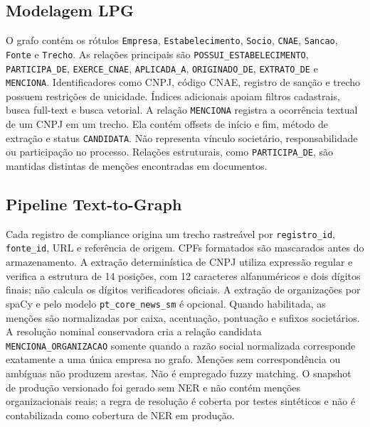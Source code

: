\documentclass[conference]{IEEEtran}
\begin{document}
\subsection{Modelagem LPG}
O grafo contém os rótulos \texttt{Empresa}, \texttt{Estabelecimento}, \texttt{Socio}, \texttt{CNAE}, \texttt{Sancao}, \texttt{Fonte} e \texttt{Trecho}. As relações principais são \texttt{POSSUI\_ESTABELECIMENTO}, \texttt{PARTICIPA\_DE}, \texttt{EXERCE\_CNAE}, \texttt{APLICADA\_A}, \texttt{ORIGINADO\_DE}, \texttt{EXTRATO\_DE} e \texttt{MENCIONA}. Identificadores como CNPJ, código CNAE, registro de sanção e trecho possuem restrições de unicidade. Índices adicionais apoiam filtros cadastrais, busca full-text e busca vetorial.
A relação \texttt{MENCIONA} registra a ocorrência textual de um CNPJ em um trecho. Ela contém offsets de início e fim, método de extração e status \texttt{CANDIDATA}. Não representa vínculo societário, responsabilidade ou participação no processo. Relações estruturais, como \texttt{PARTICIPA\_DE}, são mantidas distintas de menções encontradas em documentos.
\subsection{Pipeline Text-to-Graph}
Cada registro de compliance origina um trecho rastreável por \texttt{registro\_id}, \texttt{fonte\_id}, URL e referência de origem. CPFs formatados são mascarados antes do armazenamento. A extração determinística de CNPJ utiliza expressão regular e verifica a estrutura de 14 posições, com 12 caracteres alfanuméricos e dois dígitos finais; não calcula os dígitos verificadores oficiais.
A extração de organizações por spaCy e pelo modelo \texttt{pt\_core\_news\_sm} é opcional. Quando habilitada, as menções são normalizadas por caixa, acentuação, pontuação e sufixos societários. A resolução nominal conservadora cria a relação candidata \texttt{MENCIONA\_ORGANIZACAO} somente quando a razão social normalizada corresponde exatamente a uma única empresa no grafo. Menções sem correspondência ou ambíguas não produzem arestas. Não é empregado fuzzy matching. O snapshot de produção versionado foi gerado sem NER e não contém menções organizacionais reais; a regra de resolução é coberta por testes sintéticos e não é contabilizada como cobertura de NER em produção.
\end{document}
